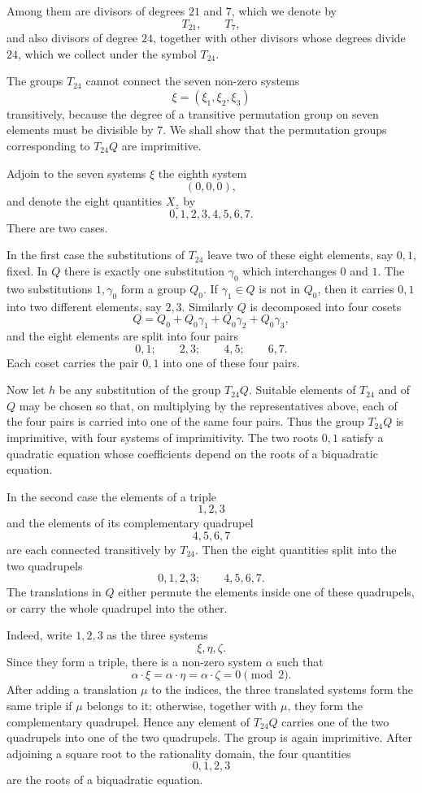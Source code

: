 \documentclass[11pt,a4paper]{book}
\begin{document}
Among them are divisors of degrees \(21\) and \(7\), which we denote by
\[
 T_{21},\qquad T_7,
\]
and also divisors of degree \(24\), together with other divisors whose degrees divide \(24\), which we collect under the symbol \(T_{24}\).

The groups \(T_{24}\) cannot connect the seven non-zero systems
\[
 \xi=(\xi_1,\xi_2,\xi_3)
\]
transitively, because the degree of a transitive permutation group on seven elements must be divisible by \(7\).  We shall show that the permutation groups corresponding to \(T_{24}Q\) are imprimitive.

Adjoin to the seven systems \(\xi\) the eighth system
\[
 (0,0,0),
\]
and denote the eight quantities \(X_z\) by
\[
 0,1,2,3,4,5,6,7.
\]
There are two cases.

In the first case the substitutions of \(T_{24}\) leave two of these eight elements, say \(0,1\), fixed.  In \(Q\) there is exactly one substitution \(\gamma_0\) which interchanges \(0\) and \(1\).  The two substitutions \(1,\gamma_0\) form a group \(Q_0\).  If \(\gamma_1\in Q\) is not in \(Q_0\), then it carries \(0,1\) into two different elements, say \(2,3\).  Similarly \(Q\) is decomposed into four cosets
\[
 Q=Q_0+Q_0\gamma_1+Q_0\gamma_2+Q_0\gamma_3,
\]
and the eight elements are split into four pairs
\[
 0,1;\qquad 2,3;\qquad 4,5;\qquad 6,7 .
\]
Each coset carries the pair \(0,1\) into one of these four pairs.

Now let \(h\) be any substitution of the group \(T_{24}Q\).  Suitable elements of \(T_{24}\) and of \(Q\) may be chosen so that, on multiplying by the representatives above, each of the four pairs is carried into one of the same four pairs.  Thus the group \(T_{24}Q\) is imprimitive, with four systems of imprimitivity.  The two roots \(0,1\) satisfy a quadratic equation whose coefficients depend on the roots of a biquadratic equation.

In the second case the elements of a triple
\[
 1,2,3
\]
and the elements of its complementary quadrupel
\[
 4,5,6,7
\]
are each connected transitively by \(T_{24}\).  Then the eight quantities split into the two quadrupels
\[
 0,1,2,3;\qquad 4,5,6,7 .
\]
The translations in \(Q\) either permute the elements inside one of these quadrupels, or carry the whole quadrupel into the other.

Indeed, write \(1,2,3\) as the three systems
\[
 \xi,\eta,\zeta.
\]
Since they form a triple, there is a non-zero system \(\alpha\) such that
\[
 \alpha\cdot\xi=\alpha\cdot\eta=\alpha\cdot\zeta=0\pmod2.
\]
After adding a translation \(\mu\) to the indices, the three translated systems form the same triple if \(\mu\) belongs to it; otherwise, together with \(\mu\), they form the complementary quadrupel.  Hence any element of \(T_{24}Q\) carries one of the two quadrupels into one of the two quadrupels.  The group is again imprimitive.  After adjoining a square root to the rationality domain, the four quantities
\[
 0,1,2,3
\]
are the roots of a biquadratic equation.
\end{document}
